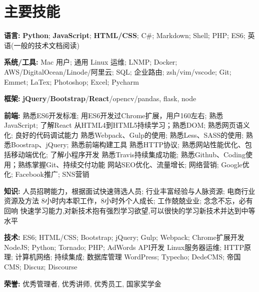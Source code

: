 \section{\textbf{主要技能}}
\resumeSubHeadingListStart
\item{
  \textbf{语言:}{ \textbf{Python}; \textbf{JavaScript}; \textbf{HTML/CSS}; C\#; Markdown; Shell; PHP; ES6; 英语(一般的技术文档阅读)}
}
\item{
 \textbf{系统/工具:}{ Mac 用户; 通用 Linux 运维; LNMP; Docker; AWS/DigitalOcean/Linode/阿里云; SQL; 企业路由; zsh/vim/vscode; Git; Emmet; LaTex; Photoshop; Excel; Pycharm}
}
\item{
 \textbf{框架:}{ \textbf{jQuery}/\textbf{Bootstrap}/\textbf{React}/opencv/pandas, flask, node}
}
\item{
  \textbf{前端:}{
    \resumeItemListStart
       {熟悉ES6开发标准; 用ES6开发过Chrome扩展，用户160左右; 熟悉JavaScript; 了解React}
       {从HTML4到HTML5持续学习；熟悉DOM; 熟悉网页语义化; 良好的代码调试能力}
       {熟悉Webpack、Gulp的使用; 熟悉Less、SASS的使用; 熟悉Boostrap、jQuery; 熟悉前端构建工具}
       {熟悉HTTP协议; 熟悉网站性能优化、包括移动端优化; 了解小程序开发}
       {熟悉Travis持续集成功能; 熟悉Github、Coding使用；熟练掌握Git、持续交付功能}
       {网站SEO优化、流量增长; 网络营销; Google优化; Facebook推广; SNS营销}
   \resumeItemListEnd
  }
}
\item{
  \textbf{知识:}{
    \resumeItemListStart
       {人员招聘能力，根据面试快速筛选人员; 行业丰富经验与人脉资源; 电商行业资源及方法}
       {8小时内本职工作，8小时外个人成长; 工作兢兢业业; 念念不忘，必有回响}
       {快速学习能力,对新技术抱有强烈学习欲望,可以很快的学习新技术并达到中等水平}
   \resumeItemListEnd
  }
}
\item{
  \textbf{技术:}{
    \resumeItemListStart
       {ES6; HTML/CSS; Bootstrap; jQuery; Gulp; Webpack; Chrome扩展开发}
       {NodeJS; Python; Tornado; PHP; AdWords API开发}
       {Linux服务器运维; HTTP原理; 计算机网络; 持续集成; 数据库管理}
       {WordPress; Typecho; DedeCMS; 帝国 CMS; Discuz; Discourse}
   \resumeItemListEnd
  }
}
\item{
 \textbf{荣誉:}{
  优秀管理者, 优秀讲师, 优秀员工, 国家奖学金
 }
}
\resumeSubHeadingListEnd

